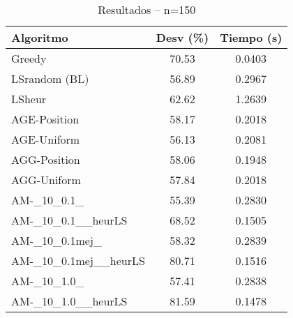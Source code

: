 \begin{table}[ht]
  \centering
  \caption{Resultados – n=150}
  \begin{tabular}{lcc}
  \hline
  Algoritmo & Desv (\%) & Tiempo (s) \\
  \hline
  Greedy & 70.53 & 0.0403 \\
  LSrandom (BL) & 56.89 & 0.2967 \\
  LSheur & 62.62 & 1.2639 \\
  AGE-Position & 58.17 & 0.2018 \\
  AGE-Uniform & 56.13 & 0.2081 \\
  AGG-Position & 58.06 & 0.1948 \\
  AGG-Uniform & 57.84 & 0.2018 \\
  AM-\_10\_0.1\_ & 55.39 & 0.2830 \\
  AM-\_10\_0.1\_\_heurLS & 68.52 & 0.1505 \\
  AM-\_10\_0.1mej\_ & 58.32 & 0.2839 \\
  AM-\_10\_0.1mej\_\_heurLS & 80.71 & 0.1516 \\
  AM-\_10\_1.0\_ & 57.41 & 0.2838 \\
  AM-\_10\_1.0\_\_heurLS & 81.59 & 0.1478 \\
  \hline
  \end{tabular}
\end{table}